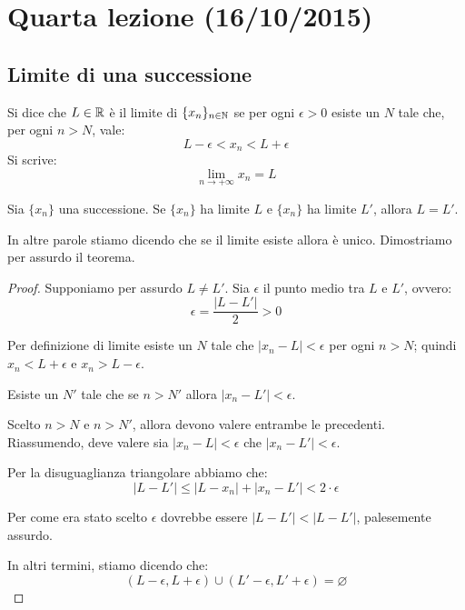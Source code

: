\chapter{Quarta lezione (16/10/2015)}

\section{Limite di una successione}

\begin{definition}
Si dice che $L \in \mathbb R$ è il limite di $\{x_n\}_{n \in \mathbb N}$ se per ogni $\epsilon > 0$ esiste un $N$ tale che, per ogni $n > N$, vale:
\begin{equation*}
L - \epsilon < x_n < L + \epsilon
\end{equation*}
Si scrive:
\begin{equation*}
\lim_{n \to +\infty} x_n = L
\end{equation*}
\end{definition}

\begin{theorem}
Sia $\{x_n\}$ una successione. Se $\{x_n\}$ ha limite $L$ e $\{x_n\}$ ha limite $L'$, allora $L = L'$.
\end{theorem}

In altre parole stiamo dicendo che se il limite esiste allora è unico. Dimostriamo per assurdo il teorema.

\begin{proof}
Supponiamo per assurdo $L \neq L'$. Sia $\epsilon$ il punto medio tra $L$ e $L'$, ovvero:
\begin{equation*}
\epsilon = \frac{|L - L'|}{2} > 0
\end{equation*}

Per definizione di limite esiste un $N$ tale che $|x_n - L| < \epsilon$ per ogni $n > N$; quindi $x_n < L + \epsilon$ e $x_n > L - \epsilon$.

Esiste un $N'$ tale che se $n > N'$ allora $|x_n - L'| < \epsilon$.

Scelto $n > N$ e $n > N'$, allora devono valere entrambe le precedenti. Riassumendo, deve valere sia $|x_n - L| < \epsilon$ che $|x_n - L'| < \epsilon$.

Per la disuguaglianza triangolare abbiamo che:
\begin{equation*}
|L - L'| \le |L - x_n| + |x_n - L'| < 2\cdot\epsilon
\end{equation*}

Per come era stato scelto $\epsilon$ dovrebbe essere $|L - L'| < |L - L'|$, palesemente assurdo.

In altri termini, stiamo dicendo che:
\begin{equation*}
(L - \epsilon, L + \epsilon) \cup (L' - \epsilon, L' + \epsilon) = \varnothing
\end{equation*}
\end{proof}

